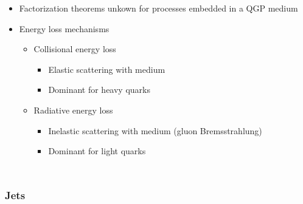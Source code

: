 \documentclass[9pt]{beamer}
\begin{document}
\begin{frame}
\begin{columns}
         \begin{itemize}
         \item Factorization theorems unkown for processes embedded in a QGP medium
         \item Energy loss mechanisms
           \begin{itemize}
           \item Collisional energy loss
             \begin{itemize}
             \item Elastic scattering with medium
             \item Dominant for heavy quarks
             \end{itemize}
           \item Radiative energy loss
             \begin{itemize}
             \item Inelastic scattering with medium (gluon Bremsstrahlung)
             \item Dominant for light quarks
             \end{itemize}
           \end{itemize}
         \end{itemize}
       \end{columns}
     \end{frame}

     \begin{frame}
       \frametitle{\textbf{Jets}}
     \end{frame}
\end{document}
